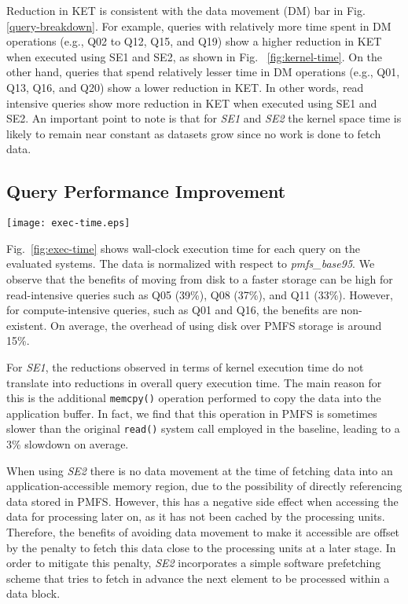  Reduction in KET is consistent with the 
 data movement (DM) bar in Fig. \ref{query-breakdown}. 
 For example, queries with relatively more time spent in DM operations 
 (e.g., Q02 to Q12, Q15, and Q19) show a higher reduction in KET  
 when executed using SE1 and SE2, as shown in Fig. ~\ref{fig:kernel-time}. On the other hand, 
 queries that spend relatively lesser time in DM operations (e.g., Q01, Q13, Q16, and Q20) show a  lower reduction in KET. 
 In other words, read intensive  queries show more reduction in KET 
 when executed using SE1 and SE2.
 An important point to note is that for \textit{SE1} and \textit{SE2} the kernel space time is likely to remain near constant as datasets grow since no work is done to fetch data.

\subsection{Query Performance Improvement}

\begin{figure*}
\centering
\texttt{[image: exec-time.eps]}
\caption{Wall-clock execution time normalized with respect to \textit{pmfs\_base95}}
\label{fig:exec-time}
\end{figure*}

Fig.~\ref{fig:exec-time} shows wall-clock execution time for each query on the evaluated systems. The data is 
normalized with respect to \textit{pmfs\_base95}. We observe that the benefits of moving from disk to a faster storage can be high for read-intensive queries such as Q05 (39\%), Q08 (37\%), and Q11 (33\%). 
However, for compute-intensive queries, such as Q01 and Q16, 
the benefits are non-existent. On average, the overhead of using disk over PMFS storage is around 15\%.

For \textit{SE1}, the reductions observed in terms of kernel execution time do not translate into reductions in overall query execution 
time. The main reason for this is the additional \verb+memcpy()+ operation performed to copy the data into the application buffer. In fact, 
we find that this operation in PMFS is sometimes slower than the original \verb+read()+ system call employed in the baseline, leading to a 
3\% slowdown on average.

When using \textit{SE2} there is no data movement at the time of fetching data into an application-accessible memory region, due 
to the possibility of directly referencing data stored in PMFS. However, this has a negative side effect when accessing the data 
for processing later on, as it has not been cached by the processing units. Therefore, the benefits of avoiding data movement to 
make it accessible are offset by the penalty to fetch this data close to the processing units at a later stage. 
In order to mitigate this penalty, \textit{SE2} incorporates a simple software prefetching scheme that tries to fetch in advance 
the next element to be processed within a data block. 

